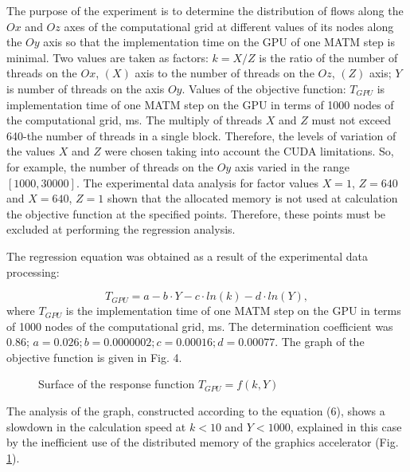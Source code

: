\documentclass{svproc}
\begin{document}
The purpose of the experiment is to determine the distribution of flows along the $Ox$ and $Oz$ axes of the computational grid at different values of its nodes along the $Oy$ axis so that the implementation time on the GPU of one MATM step is minimal.
Two values are taken as factors: $k=X/Z$ is the ratio of the number of threads on the $Ox$, $(X)$ axis to the number of threads on the $Oz$, $(Z)$ axis; $Y$ is number of threads on the axis $Oy$.
Values of the objective function: $T_{GPU}$ is implementation time of one MATM step on the GPU in terms of 1000 nodes of the computational grid, ms.
The multiply of threads $X$ and $Z$ must not exceed 640-the number of threads in a single block. Therefore, the levels of variation of the values $X$ and $Z$ were chosen taking into account the CUDA limitations.
So, for example, the number of threads on the $Oy$ axis varied in the range $[1000, 30000]$.
The experimental data analysis for factor values $X=1$, $Z=640$ and $X=640$, $Z=1$ shown that the allocated memory is not used at calculation the objective function at the specified points.
Therefore, these points must be excluded at performing the regression analysis.

The regression equation was obtained as a result of the experimental data processing:

\begin{equation}	
	T_{GPU} = a - b\cdot Y - c\cdot ln(k) - d\cdot ln(Y),
\end{equation}
where $T_{GPU}$ is the implementation time of one MATM step on the GPU in terms of 1000 nodes of the computational grid, ms.
The determination coefficient was 0.86; $a=0.026; b=0.0000002; c=0.00016; d=0.00077$. The graph of the objective function is given in Fig. 4.


\begin{figure}[h!]
	\caption{Surface of the response function $T_{GPU} = f(k, Y)$} \label{fig4}
\end{figure}

The analysis of the graph, constructed according to the equation (6), shows a slowdown in the calculation speed at $k<10$ and $Y<1000$, explained in this case by the inefficient use of the distributed memory of the graphics accelerator (Fig. \ref{fig4}).
\end{document}

